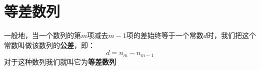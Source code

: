 \part{\textbf{等差数列}}

一般地，当一个数列的第$m$项减去$m-1$项的差始终等于一个常数$d$时，我们把这个常数叫做该数列的\textbf{公差}，即：
\begin{equation}
    d = n_m - n_{m-1}
\end{equation}
对于这种数列我们就叫它为\textbf{等差数列}
